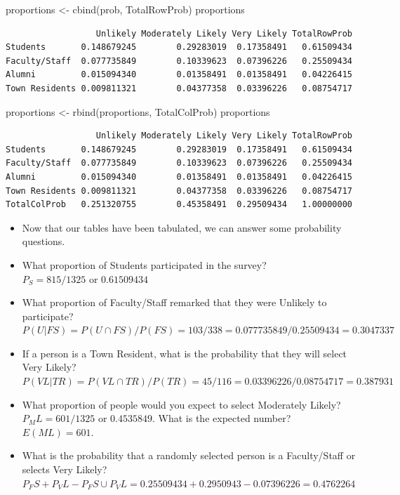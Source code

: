 \documentclass[
  letterpaper,
  DIV=11,
  numbers=noendperiod]{scrreprt}
\newenvironment{Shaded}{\begin{snugshade}}{\end{snugshade}}
\newcommand{\FunctionTok}[1]{\textcolor[rgb]{0.28,0.35,0.67}{#1}}
\newcommand{\NormalTok}[1]{\textcolor[rgb]{0.00,0.23,0.31}{#1}}
\newcommand{\OtherTok}[1]{\textcolor[rgb]{0.00,0.23,0.31}{#1}}
\begin{document}
\begin{Shaded}
\begin{Highlighting}[]
\NormalTok{proportions }\OtherTok{\textless{}{-}} \FunctionTok{cbind}\NormalTok{(prob, TotalRowProb)}
\NormalTok{proportions}
\end{Highlighting}
\end{Shaded}

\begin{verbatim}
                  Unlikely Moderately Likely Very Likely TotalRowProb
Students       0.148679245        0.29283019  0.17358491   0.61509434
Faculty/Staff  0.077735849        0.10339623  0.07396226   0.25509434
Alumni         0.015094340        0.01358491  0.01358491   0.04226415
Town Residents 0.009811321        0.04377358  0.03396226   0.08754717
\end{verbatim}

\begin{Shaded}
\begin{Highlighting}[]
\NormalTok{proportions }\OtherTok{\textless{}{-}} \FunctionTok{rbind}\NormalTok{(proportions, TotalColProb)}
\NormalTok{proportions}
\end{Highlighting}
\end{Shaded}

\begin{verbatim}
                  Unlikely Moderately Likely Very Likely TotalRowProb
Students       0.148679245        0.29283019  0.17358491   0.61509434
Faculty/Staff  0.077735849        0.10339623  0.07396226   0.25509434
Alumni         0.015094340        0.01358491  0.01358491   0.04226415
Town Residents 0.009811321        0.04377358  0.03396226   0.08754717
TotalColProb   0.251320755        0.45358491  0.29509434   1.00000000
\end{verbatim}

\begin{itemize}
\item
  Now that our tables have been tabulated, we can answer some
  probability questions.
\item
  What proportion of Students participated in the survey?\\
  \(P_S= 815/1325\) or \(0.61509434\)
\item
  What proportion of Faculty/Staff remarked that they were Unlikely to
  participate?\\
  \(P(U|FS) = P(U \cap FS) / P(FS) = 103/338 = 0.077735849/0.25509434 = 0.3047337\)
\item
  If a person is a Town Resident, what is the probability that they will
  select Very Likely?\\
  \(P(VL|TR) = P(VL \cap TR) / P(TR) = 45/116 = 0.03396226/0.08754717 = 0.387931\)
\item
  What proportion of people would you expect to select Moderately
  Likely?\\
  \(P_ML = 601/1325\) or \(0.4535849\). What is the expected number?
  \(E(ML) = 601\).
\item
  What is the probability that a randomly selected person is a
  Faculty/Staff or selects Very Likely?\\
  \(P_FS + P_VL - P_FS \cup P_VL = 0.25509434 + 0.2950943 − 0.07396226 = 0.4762264\)
\end{itemize}
\end{document}
